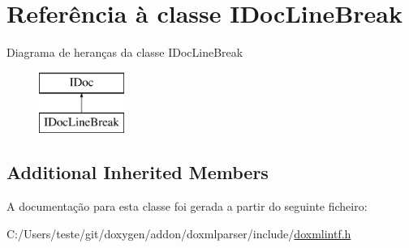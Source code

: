 \hypertarget{class_i_doc_line_break}{\section{Referência à classe I\-Doc\-Line\-Break}
\label{class_i_doc_line_break}
}
Diagrama de heranças da classe I\-Doc\-Line\-Break\begin{figure}[H]
\begin{center}
\leavevmode
\includegraphics[height=2.000000cm]{class_i_doc_line_break}
\end{center}
\end{figure}
\subsection*{Additional Inherited Members}


A documentação para esta classe foi gerada a partir do seguinte ficheiro\-:\begin{DoxyCompactItemize}
\item 
C\-:/\-Users/teste/git/doxygen/addon/doxmlparser/include/\hyperlink{include_2doxmlintf_8h}{doxmlintf.\-h}\end{DoxyCompactItemize}
